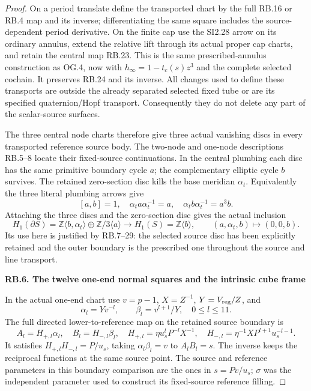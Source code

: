 \begin{proof}
On a period translate define the transported chart by the full
RB.16 or RB.4 map and its inverse; differentiating the same square
includes the source-dependent period derivative. On the finite
cap use the SI2.28 arrow on its ordinary annulus, extend the
relative lift through its actual proper cap charts, and retain
the central map RB.23. This is the same prescribed-annulus
construction as OG.4, now with \(h_\infty=1-t_c(s)z^3\) and
the complete selected cochain. It preserves RB.24 and its inverse.
All changes used to define these transports are outside the
already separated selected fixed tube or are its specified
quaternion/Hopf transport. Consequently they do not delete any
part of the scalar-source surfaces.

The three central node charts therefore give three actual
vanishing discs in every transported reference source body.
The two-node and one-node descriptions RB.5--8 locate their
fixed-source continuations. In the central plumbing each disc
has the same primitive boundary cycle \(a\); the complementary
elliptic cycle \(b\) survives. The retained zero-section disc
kills the base meridian \(\alpha_t\). Equivalently the three
literal plumbing arrows give
\[
 [a,b]=1,\quad\alpha_t a\alpha_t^{-1}=a,\quad
 \alpha_t b\alpha_t^{-1}=a^3b.
\]
Attaching the three discs and the zero-section disc gives the
actual inclusion
\[
 H_1(\partial S)=\mathbb Z\langle b,\alpha_t\rangle
       \oplus\mathbb Z/3\langle a\rangle
 \longrightarrow H_1(S)=\mathbb Z\langle b\rangle,
 \qquad (a,\alpha_t,b)\longmapsto(0,0,b).
 \tag{RB.30}
\]
Its use here is justified by RB.7--29: the selected source disc
has been explicitly retained and the outer boundary is the
prescribed one throughout the source and line transport.

\par

\medskip\noindent\textbf{RB.6. The twelve one-end normal squares and the intrinsic cube frame}

\par\nobreak

In the actual one-end chart use \(v=p-1\),
\(X=Z^{-1}\), \(Y=V_{\rm reg}/Z\), and
\[
 \alpha_l=Yv^{-l},\qquad\beta_l=v^{l+1}/Y,
                \quad0\le l\le11.
\]
The full directed lower-to-reference map on the retained source
boundary is
\[
 A_l=H_{+,l}\alpha_l,\quad B_l=H_{-,l}\beta_l,
\quad H_{+,l}=\eta u_s^lP^{-l}X^{-1},\quad
 H_{-,l}=\eta^{-1}XP^{l+1}u_s^{-l-1}.
 \tag{RB.31}
\]
It satisfies \(H_{+,l}H_{-,l}=P/u_s\), taking
\(\alpha_l\beta_l=v\) to \(A_lB_l=s\). The inverse keeps
the reciprocal functions at the same source point. The source
and reference parameters in this boundary comparison are the
ones in \(s=Pv/u_s\); \(\sigma\) was the independent parameter
used to construct its fixed-source reference filling.


\end{proof}
